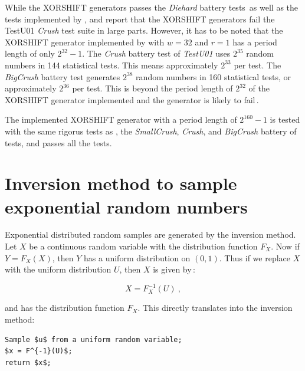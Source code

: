\documentclass[a4paper]{scrartcl}
\begin{document}
While the XORSHIFT generators passes the {\it Diehard} battery tests\,\citep{Marsaglia1995} as well as the tests implemented by \citet{Marsaglia2002}, \citet{L'Ecuyer2007} and \citet{Panneton2005} report that the XORSHIFT generators fail the TestU01 {\it Crush} test suite in large parts. However, it has to be noted that the XORSHIFT generator implemented by \citet{L'Ecuyer2007} with $w = 32$ and $r = 1$ has a period length of only $2^{32} - 1$. The {\it Crush} battery test of {\it TestU01} uses $2^{35}$ random numbers in 144 statistical tests. This means approximately $2^{33}$ per test. The {\it BigCrush} battery test generates $2^{38}$ random numbers in 160 statistical tests, or approximately $2^{36}$ per test. This is beyond the period length of $2^{32}$ of the XORSHIFT generator implemented and the generator is likely to fail\,\citep{L'Ecuyer2007}.

The implemented XORSHIFT generator with a period length of $2^{160} - 1$ is tested with the same rigorus tests as \citet{L'Ecuyer2007}, the {\it SmallCrush}, {\it Crush}, and {\it BigCrush} battery of tests, and passes all the tests.


\section*{Inversion method to sample exponential random numbers}
Exponential distributed random samples are generated by the inversion method.
%
Let $X$ be a continuous random variable with the distribution function $F_X$. Now if $Y = F_X(X)$, then $Y$ has a uniform distribution on $(0, 1)$. Thus if we replace $X$ with the uniform distribution $U$, then $X$ is given by\,\citep{Devroye1980}:

\begin{equation*}
X=F_X^{-1}(U)~,
\end{equation*}

and has the distribution function $F_X$. This directly translates into the inversion method:\vspace{3mm}

{
\begin{lstlisting}[caption={Inversion method to sample exponential random numbers\,\citep{Devroye1986}.}, label=alg:inversion_method]
Sample $u$ from a uniform random variable;
$x = F^{-1}(U)$;
return $x$;
\end{lstlisting}
}
\end{document}
